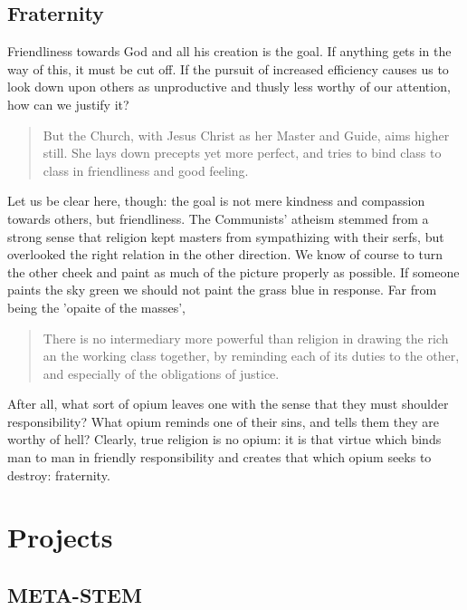 \documentclass[letterpaper]{article}
\begin{document}
\subsection{Fraternity}

Friendliness towards God and all his creation is the goal. If anything gets in the way of this, it must be cut off. If the pursuit of increased efficiency causes us to look down upon others as unproductive and thusly less worthy of our attention, how can we justify it?

\begin{quote}
  But the Church, with Jesus Christ as her Master and Guide, aims higher still. She lays down precepts yet more perfect, and tries to bind class to class in friendliness and good feeling.
\end{quote}

Let us be clear here, though: the goal is not mere kindness and compassion towards others, but friendliness. The Communists' atheism stemmed from a strong sense that religion kept masters from sympathizing with their serfs, but overlooked the right relation in the other direction. We know of course to turn the other cheek and paint as much of the picture properly as possible. If someone paints the sky green we should not paint the grass blue in response. Far from being the 'opaite of the masses',

\begin{quote}
  There is no intermediary more powerful than religion in drawing the rich an the working class together, by reminding each of its duties to the other, and especially of the obligations of justice.
\end{quote}

After all, what sort of opium leaves one with the sense that they must shoulder responsibility? What opium reminds one of their sins, and tells them they are worthy of hell? Clearly, true religion is no opium: it is that virtue which binds man to man in friendly responsibility and creates that which opium seeks to destroy: fraternity.

\iffalse
\section{Projects}

\subsection{META-STEM}
\end{document}
